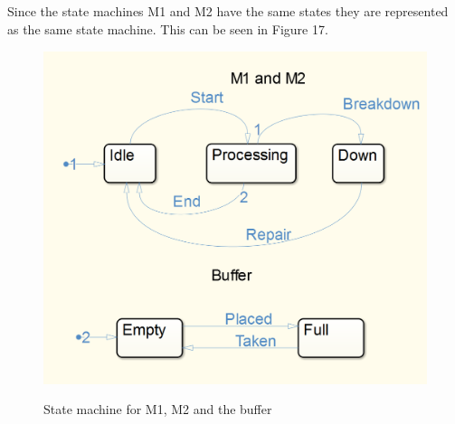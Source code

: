 \documentclass[12pt,a4paper]{article}
\begin{document}
\subsection{}
Since the state machines M1 and M2 have the same states they are
represented as the same state machine. This can be seen in Figure 17.	
\begin{center}
	\begin{figure}[H]
      \centering
	\includegraphics[scale=0.5]{des1.png}
	\label{fig:des1}
	\caption{State machine for M1, M2 and the buffer}
	\end{figure}
\end{center}
\end{document}
